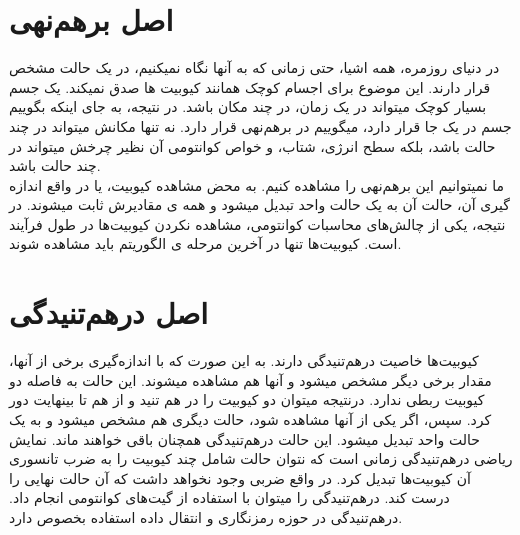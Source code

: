 \section{اصل برهم‌نهی}
در دنیای روزمره، همه اشیا، حتی زمانی که به آنها نگاه نمیکنیم، در یک حالت مشخص قرار دارند. این موضوع برای اجسام کوچک همانند کیوبیت ها صدق نمیکند. یک جسم بسیار کوچک میتواند در یک زمان، در چند مکان باشد. در نتیجه، به جای اینکه بگوییم جسم در یک جا قرار دارد، میگوییم در برهم‌نهی قرار دارد. نه تنها مکانش میتواند در چند حالت باشد، بلکه سطح انرژی، شتاب، و خواص کوانتومی آن نظیر چرخش
 میتواند در چند حالت باشد. 
\\
ما نمیتوانیم این برهم‌نهی را مشاهده کنیم. به محض مشاهده کیوبیت، یا در واقع اندازه گیری آن، حالت آن به یک حالت واحد تبدیل میشود و همه ی مقادیرش ثابت میشوند. در نتیجه، یکی از چالش‌های محاسبات کوانتومی، مشاهده نکردن کیوبیت‌ها در طول فرآیند است. کیوبیت‌ها تنها در آخرین مرحله ی الگوریتم باید مشاهده شوند.
\cite{cambridgebook}
\section{اصل درهم‌تنیدگی}
کیوبیت‌ها خاصیت درهم‌تنیدگی
دارند. به این صورت که با اندازه‌گیری برخی از آنها، مقدار برخی دیگر مشخص میشود و آنها هم مشاهده میشوند. این حالت به فاصله دو کیوبیت ربطی ندارد. درنتیجه میتوان دو کیوبیت را در هم تنید و از هم تا بینهایت دور کرد. سپس، اگر یکی از آنها مشاهده شود، حالت دیگری هم مشخص میشود و به یک حالت واحد تبدیل میشود. این حالت درهم‌تنیدگی همچنان باقی خواهند ماند. نمایش ریاضی درهم‌تنیدگی زمانی است که نتوان حالت شامل چند کیوبیت را به ضرب تانسوری آن کیوبیت‌ها تبدیل کرد. در واقع ضربی وجود نخواهد داشت که آن حالت نهایی را درست کند. درهم‌تنیدگی را میتوان با استفاده از گیت‌های کوانتومی انجام داد. درهم‌تنیدگی در حوزه رمزنگاری و انتقال داده استفاده بخصوص دارد.
\cite{cambridgebook}
